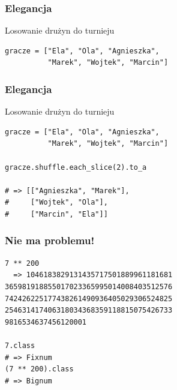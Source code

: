 \begin{frame}[fragile]
\frametitle{Elegancja}
\begin{block}{Losowanie drużyn do turnieju}
\begin{lstlisting}[style=Ruby]
gracze = ["Ela", "Ola", "Agnieszka",
          "Marek", "Wojtek", "Marcin"]
\end{lstlisting}
\end{block}
\end{frame}
\begin{frame}[fragile]
\frametitle{Elegancja}
\begin{block}{Losowanie drużyn do turnieju}
\begin{lstlisting}[style=Ruby]
gracze = ["Ela", "Ola", "Agnieszka",
          "Marek", "Wojtek", "Marcin"]

gracze.shuffle.each_slice(2).to_a

# => [["Agnieszka", "Marek"],
#     ["Wojtek", "Ola"],
#     ["Marcin", "Ela"]]
\end{lstlisting}
\end{block}
\end{frame}


\begin{frame}[fragile]
\frametitle{Nie ma problemu!}
\begin{block}{}
\begin{lstlisting}[style=Ruby]
7 ** 200
  => 1046183829131435717501889961181681
365981918855017023365995014008403512576
742426225177438261490936405029306524825
254631417406318034368359118815075426733
9816534637456120001

7.class
# => Fixnum
(7 ** 200).class
# => Bignum
\end{lstlisting}
\end{block}
\end{frame}



